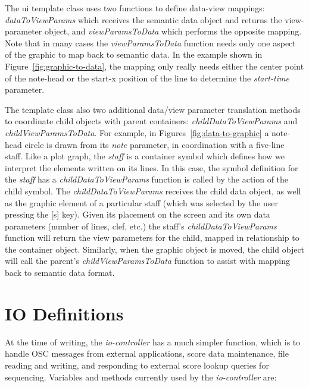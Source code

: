 \documentclass{article}
\def\iocontroller{\textit{io-controller}\xspace}
\begin{document}
The ui template class uses two functions to define data-view mappings: \textit{dataToViewParams} which receives the semantic data object and returns the view-parameter object, and \textit{viewParamsToData} which performs the opposite mapping.
Note that in many cases the \textit{viewParamsToData} function needs only one aspect of the graphic to map back to semantic data. In the example shown in Figure~\ref{fig:graphic-to-data}, the mapping only really needs either the center point of the note-head or the start-x position of the line to determine the \textit{start-time} parameter.

The template class also two additional data/view parameter translation methods to coordinate child objects with parent containers: \textit{childDataToViewParams} and \textit{childViewParamsToData}.
For example, in Figures~\ref{fig:data-to-graphic} a note-head circle is drawn from its \textit{note} parameter, in coordination with a five-line staff.
Like a plot graph, the \textit{staff} is a container symbol which defines how we interpret the elements written on its lines. 
In this case, the symbol definition for the \textit{staff} has a \textit{childDataToViewParams} function is called by the action of the child symbol. 
The \textit{childDataToViewParams} receives the child data object, as well as the graphic element of a particular staff (which was selected by the user pressing the [s] key). Given its placement on the screen and its own data parameters (number of lines, clef, etc.) the staff's \textit{childDataToViewParams} function will return the view parameters for the child, mapped in relationship to the container object.
Similarly, when the graphic object is moved, the child object will call the parent's \textit{childViewParamsToData} function to assist with mapping back to semantic data format.


\section{IO Definitions}\label{sec:io_definitions}

At the time of writing, the \iocontroller has a much simpler function, which is to handle OSC messages from external applications, score data maintenance, file reading and writing, and responding to external score lookup queries for sequencing.
Variables and methods currently used by the \iocontroller are:
\end{document}
